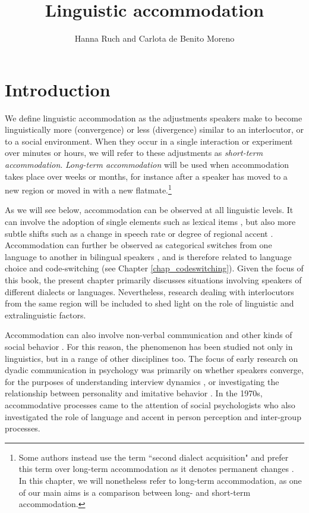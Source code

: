 \documentclass[output=paper]{langscibook}
\title{Linguistic accommodation}
\author{Hanna Ruch\affiliation{University of Zurich} and  Carlota de Benito Moreno\affiliation{University of Zurich}}
\begin{document}
\maketitle
\label{chap_accommodation}

\section{Introduction} \label{Section_Introduction}
\largerpage[-1]
We define linguistic accommodation as the adjustments speakers make to become linguistically more (convergence) or less (divergence) similar to an interlocutor, or to a social environment. When they occur in a single interaction or experiment over minutes or hours, we will refer to these adjustments as \textit{short-term accommodation}. \textit{Long-term accommodation} will be used when accommodation takes place over weeks or months, for instance after a speaker has moved to a new region or moved in with a new flatmate.\footnote{Some authors instead use the term ``second dialect acquisition" \citep{siegel_second_2010} and prefer this term over long-term accommodation as it denotes permanent changes \citep{chambers_dialect_1992}. In this chapter, we will nonetheless refer to long-term accommodation, as one of our main aims is a comparison between long- and short-term accommodation.}

As we will see below, accommodation can be observed at all linguistic levels. It can involve the adoption of single elements such as lexical items \citep{brennan_conceptual_1996}, but also more subtle shifts such as a change in speech rate \citep{putman_conception_1984} or degree of regional accent \citep{bourhis_language_1977}. Accommodation can further be observed as categorical switches from one language to another in bilingual speakers \citep{giles_towards_1973}, and is therefore related to language choice and code-switching (see Chapter \ref{chap_codeswitching}).
Given the focus of this book, the present chapter primarily discusses situations involving speakers of different dialects or languages. Nevertheless, research dealing with interlocutors from the same region will be included to shed light on the role of linguistic and extralinguistic factors.


Accommodation can also involve non-verbal communication and other kinds of social behavior \citep{hall_behavioural_2013, dijksterhuis_perception-behavior_2001}. For this reason, the phenomenon has been studied not only in linguistics, but in a range of other disciplines too. The focus of early research on dyadic communication in psychology was primarily on whether speakers converge, for the purposes of understanding interview dynamics \citep[e.g.][]{matarazzo_interviewer_1963}, or investigating the relationship between personality and imitative behavior \citep[e.g.][]{natale_convergence_1975}. In the 1970s, accommodative processes came to the attention of social psychologists who also investigated the role of language and accent in person perception and inter-group processes. 
\end{document}
